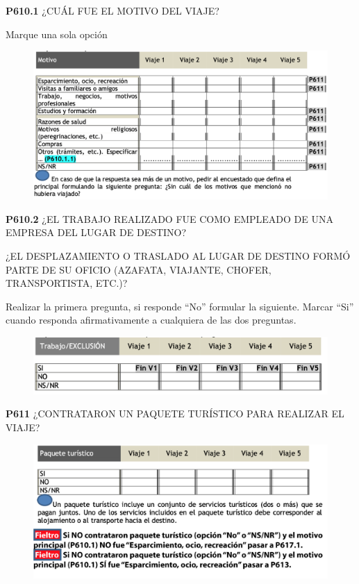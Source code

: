 \documentclass[
  openany]{book}
\begin{document}
\textbf{P610.1} ¿CUÁL FUE EL MOTIVO DEL VIAJE?

Marque una sola opción

\begin{figure}

{\centering \includegraphics[width=1\linewidth]{imagenes/figura6-217} 

}

\end{figure}

\textbf{P610.2} ¿EL TRABAJO REALIZADO FUE COMO EMPLEADO DE UNA EMPRESA DEL LUGAR DE DESTINO?

¿EL DESPLAZAMIENTO O TRASLADO AL LUGAR DE DESTINO FORMÓ PARTE DE SU OFICIO (AZAFATA, VIAJANTE, CHOFER, TRANSPORTISTA, ETC.)?

Realizar la primera pregunta, si responde ``No'' formular la siguiente. Marcar ``Si'' cuando responda afirmativamente a cualquiera de las dos preguntas.

\begin{figure}

{\centering \includegraphics[width=1\linewidth]{imagenes/figura6-218} 

}

\end{figure}

\textbf{P611} ¿CONTRATARON UN PAQUETE TURÍSTICO PARA REALIZAR EL VIAJE?

\begin{figure}

{\centering \includegraphics[width=1\linewidth]{imagenes/figura6-219} 

}

\end{figure}
\end{document}
